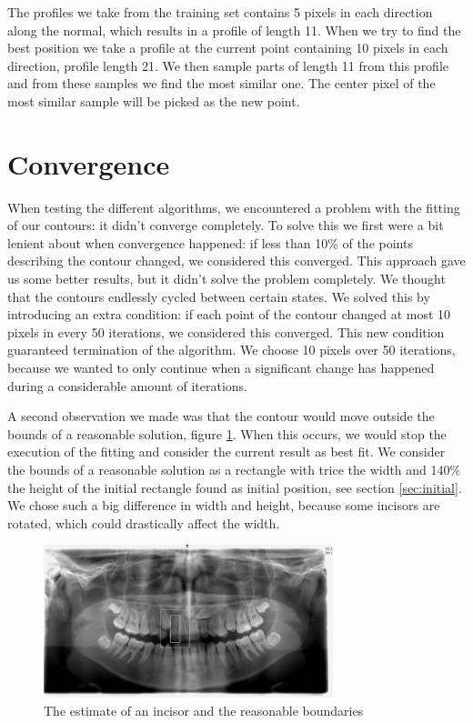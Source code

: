 \documentclass[a4paper,10pt]{article}
\begin{document}
The profiles we take from the training set contains 5 pixels in each direction along the normal, which results in a profile of length 11. When we try to find the best position we take a profile at the current point containing 10 pixels in each direction, profile length 21. We then sample parts of length 11 from this profile and from these samples we find the most similar one. The center pixel of the most similar sample will be picked as the new point.


\section{Convergence}\label{sec:convergence}
When testing the different algorithms, we encountered a problem with the fitting of our contours: it didn't converge completely. To solve this we first were a bit lenient about when convergence happened: if less than 10\% of the points describing the contour changed, we considered this converged. This approach gave us some better results, but it didn't solve the problem completely. We thought that the contours endlessly cycled between certain states. We solved this by introducing an extra condition: if each point of the contour changed at most 10 pixels in every 50 iterations, we considered this converged. This new condition guaranteed termination of the algorithm. We choose 10 pixels over 50 iterations, because we wanted to only continue when a significant change has happened during a considerable amount of iterations.

A second observation we made was that the contour would move outside the bounds of a reasonable solution, figure \ref{fig:twoBoxes}. When this occurs, we would stop the execution of the fitting and consider the current result as best fit. We consider the bounds of a reasonable solution as a rectangle with trice the width and 140\% the height of the initial rectangle found as initial position, see section \ref{sec:initial}. We chose such a big difference in width and height, because some incisors are rotated, which could drastically affect the width.

\begin{figure}[h!]
  \centering
    \includegraphics[width=0.75\textwidth]{images/twoBoxes.jpg}
  \caption{The estimate of an incisor and the reasonable boundaries}
  \label{fig:twoBoxes}
\end{figure}
\end{document}
